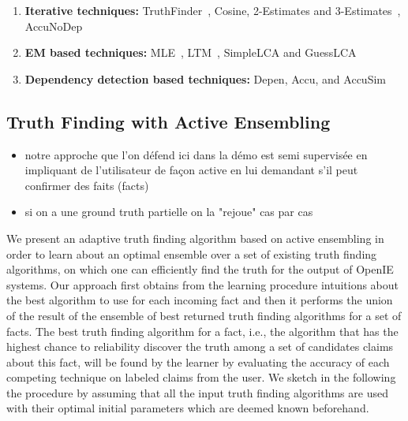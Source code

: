 \begin{enumerate}
 \item \textbf{Iterative techniques:} TruthFinder~\cite{YinHY08}, Cosine, 2-Estimates and 3-Estimates~\cite{GallandAMS10}, 
 AccuNoDep~\cite{DongBS09}
 \item \textbf{EM based techniques:} MLE~\cite{WangKLA12}, LTM~\cite{ZhaoRGH12}, SimpleLCA and GuessLCA~\cite{PasternackR13}
 \item \textbf{Dependency detection based techniques:} Depen, Accu, and AccuSim~\cite{DongBS09}
\end{enumerate}



\subsection{Truth Finding with Active Ensembling}
\begin{itemize}
 \item notre approche que l'on défend ici dans la démo est  semi supervisée en impliquant de l'utilisateur de façon active
en lui demandant s'il peut confirmer des faits (facts)
\item si on a une ground truth partielle on la "rejoue" cas par cas
\end{itemize}

\medskip

We present an adaptive truth finding algorithm based on active ensembling in order to learn about an optimal
ensemble over a set of existing truth finding algorithms, on which one can efficiently find the truth for the output 
of OpenIE systems. Our approach first obtains from the learning procedure intuitions about the best algorithm to use 
for each incoming fact and then it performs the union of the result of the ensemble of best returned truth finding algorithms
for a set of facts. The best truth finding algorithm for a fact, i.e., the algorithm that has the highest chance to reliability
discover the truth among a set of candidates claims about this fact, will be found by the learner by evaluating the accuracy of 
each competing technique on labeled claims from the user. We sketch in the following the procedure by assuming that all the input
truth finding algorithms are used with their optimal initial parameters which are deemed known beforehand.

